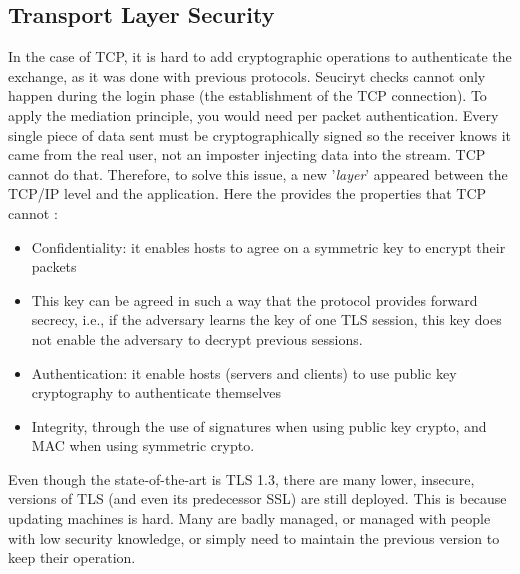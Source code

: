 \subsection{Transport Layer Security}
In the case of TCP, it is hard to add cryptographic operations to authenticate the exchange, as it was done with previous protocols. Seuciryt checks cannot only happen during the login phase (the establishment of the TCP connection). To apply the mediation principle, you would need per packet authentication. Every single piece of data sent must be cryptographically signed so the receiver knows it came from the real user, not an imposter injecting data into the stream. TCP cannot do that. Therefore, to solve this issue, a new '\textit{layer}' appeared between the TCP/IP level and the application. Here the   provides the properties that TCP cannot :
\begin{itemize}
    \item Confidentiality: it enables hosts to agree on a symmetric key to encrypt their packets
    \item This key can be agreed in such a way that the protocol provides forward secrecy, i.e., if the adversary learns the key of one TLS session, this key does not enable the adversary to decrypt previous sessions.
    \item Authentication: it enable hosts (servers and clients) to use public key cryptography to authenticate themselves
    \item Integrity, through the use of signatures when using public key crypto, and MAC when using symmetric crypto.
\end{itemize}
Even though the state-of-the-art is TLS 1.3, there are many lower, insecure, versions of TLS (and even its predecessor SSL) are still deployed. This is because updating machines is hard. Many are badly managed, or managed with people with low security knowledge, or simply need to maintain the previous version to keep their operation.

